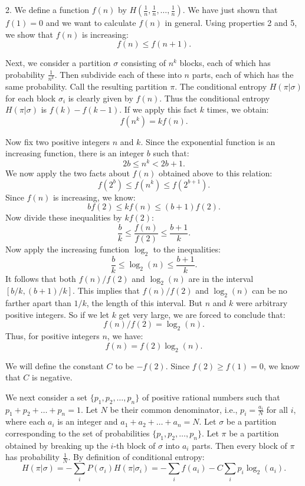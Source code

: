 \documentclass{report}
\begin{document}
2. We define a function \( f(n) \) by \( H\left(\frac{1}{n}, \frac{1}{n}, \ldots, \frac{1}{n}\right) \). We have just shown that \( f(1) = 0 \) and we want to calculate \( f(n) \) in general. Using properties 2 and 5, we show that \( f(n) \) is increasing:
\[
f(n) \leq f(n+1).
\]

Next, we consider a partition \( \sigma \) consisting of \( n^k \) blocks, each of which has probability \( \frac{1}{n^k} \). Then subdivide each of these into \( n \) parts, each of which has the same probability. Call the resulting partition \( \pi \). The conditional entropy \( H(\pi|\sigma) \) for each block \( \sigma_i \) is clearly given by \( f(n) \). Thus the conditional entropy \( H(\pi|\sigma) \) is \( f(k) - f(k-1) \). If we apply this fact \( k \) times, we obtain:
\[
f(n^k) = k f(n).
\]

Now fix two positive integers \( n \) and \( k \). Since the exponential function is an increasing function, there is an integer \( b \) such that:
\[
2b \leq n^k < 2b+1.
\]
We now apply the two facts about \( f(n) \) obtained above to this relation:
\[
f(2^b) \leq f(n^k) \leq f(2^{b+1}).
\]
Since \( f(n) \) is increasing, we know:
\[
b f(2) \leq k f(n) \leq (b+1)f(2).
\]
Now divide these inequalities by \( k f(2) \):
\[
\frac{b}{k} \leq \frac{f(n)}{f(2)} \leq \frac{b+1}{k}.
\]
Now apply the increasing function \( \log_2 \) to the inequalities:
\[
\frac{b}{k} \leq \log_2(n) \leq \frac{b+1}{k}.
\]
It follows that both \( f(n)/f(2) \) and \( \log_2(n) \) are in the interval \( [b/k, (b+1)/k] \). This implies that \( f(n)/f(2) \) and \( \log_2(n) \) can be no farther apart than \( 1/k \), the length of this interval. But \( n \) and \( k \) were arbitrary positive integers. So if we let \( k \) get very large, we are forced to conclude that:
\[
f(n)/f(2) = \log_2(n).
\]
Thus, for positive integers \( n \), we have:
\[
f(n) = f(2) \log_2(n).
\]

We will define the constant \( C \) to be \( -f(2) \). Since \( f(2) \geq f(1) = 0 \), we know that \( C \) is negative.

We next consider a set \( \{p_1, p_2, \ldots, p_n\} \) of positive rational numbers such that \( p_1 + p_2 + \ldots + p_n = 1 \). Let \( N \) be their common denominator, i.e., \( p_i = \frac{a_i}{N} \) for all \( i \), where each \( a_i \) is an integer and \( a_1 + a_2 + \ldots + a_n = N \). Let \( \sigma \) be a partition corresponding to the set of probabilities \( \{p_1, p_2, \ldots, p_n\} \). Let \( \pi \) be a partition obtained by breaking up the \( i \)-th block of \( \sigma \) into \( a_i \) parts. Then every block of \( \pi \) has probability \( \frac{1}{N} \). By definition of conditional entropy:
\[
H(\pi|\sigma) = -\sum_{i} P(\sigma_i) H(\pi|\sigma_i) = -\sum_{i} f(a_i) - C \sum_{i} p_i \log_2(a_i).
\]
\end{document}
